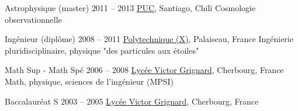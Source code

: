 \def\tbflanguage{french}
\def\tbfbordertop{1}
\def\tbfborderleft{0.7}








\begin{coordinatelist}
\end{coordinatelist}




\begin{yearlist}[7.7][\tbfborderleft][4]


\item[Astrophysique (master)]{2011 -- 2013}
	{
	\href{http://www.uc.cl/}{PUC}, Santiago, Chili
  }
  {    Cosmologie observationnelle}


\item[Ingénieur (diplôme)]{2008 -- 2011}
	{
  \href{https://www.polytechnique.edu/}{Polytechnique (X)}, Palaiseau, France}
  {    Ingénierie pluridisciplinaire, physique "des particules aux étoiles"}


\item[Math Sup - Math Spé]{2006 -- 2008}
	{
	\href{http://www.lycee-grignard.fr/}{Lyc\'ee Victor Grignard}, Cherbourg, France
	}
	{    Math, physique, sciences de l'ingénieur (MPSI)}


\item[Baccalauréat S]{2003 -- 2005}
	{
	\href{http://www.lycee-grignard.fr/}{Lyc\'ee Victor Grignard}, Cherbourg, France
	}
  {\vspace{-0.5cm}}

\end{yearlist}



